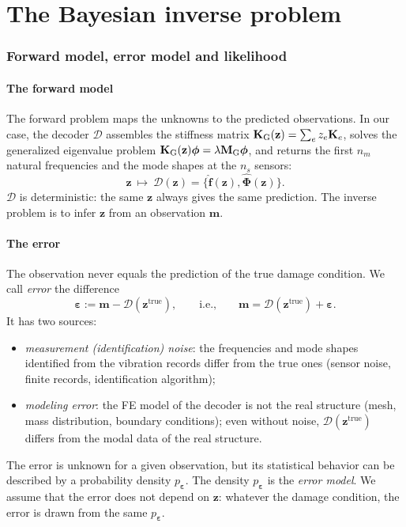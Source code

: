 \documentclass[11pt,a4paper]{article}
\numberwithin{equation}{section}
\theoremstyle{plain}
\theoremstyle{definition}
\theoremstyle{remark}
\newcommand{\m}{\mathbf{m}}
\newcommand{\z}{\mathbf{z}}
\newcommand{\eps}{\bm{\varepsilon}}
\newcommand{\Dc}{\mathcal{D}}
\begin{document}
\part{The Bayesian inverse problem}
\label{part:bayes}

\section{Forward model, error model and likelihood}
\label{sec:likelihood}

\subsection{The forward model}
The forward problem maps the unknowns to the predicted observations.
In our case, the decoder $\Dc$ assembles the stiffness matrix $\mathbf K_{\text G}(\z)=\sum_ez_e\mathbf K_e$, solves the generalized eigenvalue problem $\mathbf K_{\text G}(\z)\bm\phi=\lambda\mathbf M_{\text G}\bm\phi$, and returns the first $n_m$ natural frequencies and the mode shapes at the $n_s$ sensors:
\begin{equation}
\z\ \longmapsto\ \Dc(\z)=\{\hat{\mathbf f}(\z),\hat{\bm\Phi}(\z)\}.
\end{equation}
$\Dc$ is deterministic: the same $\z$ always gives the same prediction.
The inverse problem is to infer $\z$ from an observation $\m$.

\subsection{The error}
The observation never equals the prediction of the true damage condition. We call \emph{error} the difference
\begin{equation}
\eps:=\m-\Dc(\z^{\text{true}}),\qquad\text{i.e.,}\qquad \m=\Dc(\z^{\text{true}})+\eps.
\label{eq:obs_model}
\end{equation}
It has two sources:
\begin{itemize}
\item \emph{measurement (identification) noise}: the frequencies and mode shapes identified from the vibration records differ from the true ones (sensor noise, finite records, identification algorithm);
\item \emph{modeling error}: the FE model of the decoder is not the real structure (mesh, mass distribution, boundary conditions); even without noise, $\Dc(\z^{\text{true}})$ differs from the modal data of the real structure.
\end{itemize}
The error is unknown for a given observation, but its statistical behavior can be described by a probability density $p_{\eps}$. The density $p_{\eps}$ is the \emph{error model}.
We assume that the error does not depend on $\z$: whatever the damage condition, the error is drawn from the same $p_{\eps}$.
\end{document}
